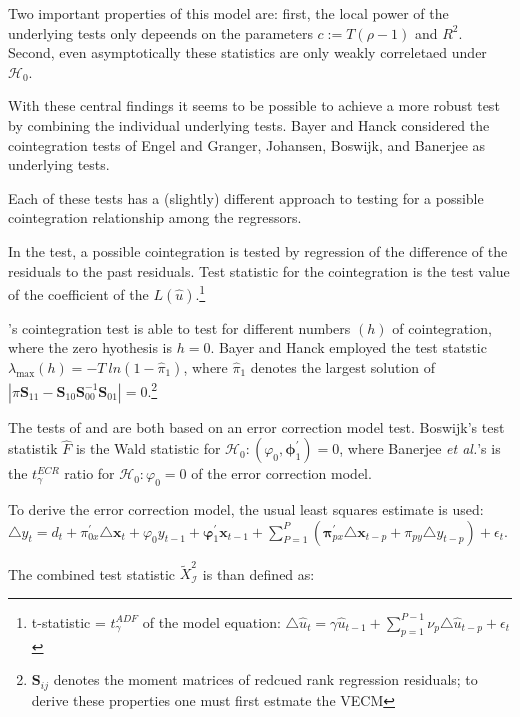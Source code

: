 \documentclass[11pt,a4paper]{article}
\let\rmarkdownfootnote\footnote%
\def\footnote{\protect\rmarkdownfootnote}
\begin{document}
Two important properties of this model are: first, the local power of
the underlying tests only depeends on the parameters \(c := T(\rho -1)\)
and \(R^2\). Second, even asymptotically these statistics are only
weakly correletaed under \(\mathcal{H}_0\).
\autocite{gregory_mixed_2004}

With these central findings it seems to be possible to achieve a more
robust test by combining the individual underlying tests. Bayer and
Hanck considered the cointegration tests of Engel and Granger, Johansen,
Boswijk, and Banerjee as underlying tests.

Each of these tests has a (slightly) different approach to testing for a
possible cointegration relationship among the regressors.

In the \textcite{Englegranger1987} test, a possible cointegration is
tested by regression of the difference of the residuals to the past
residuals. Test statistic for the cointegration is the test value of the
coefficient of the \(L(\hat{u})\).\footnote{t-statistic =
  \(t_{\gamma}^{ADF}\) of the model equation:
  \(\triangle \hat{u}_t = \gamma \hat{u}_{t-1} + \sum_{p = 1}^{P-1}\nu_p \triangle \hat{u}_{t-p} +\epsilon_t\)}

\textcite{Johansen1988}'s cointegration test is able to test for
different numbers \((h)\) of cointegration, where the zero hyothesis is
\(h = 0\). Bayer and Hanck employed the test statstic
\(\lambda_{\max} (h) = - T \ ln(1 - \hat{\pi}_1)\), where
\(\hat{\pi}_1\) denotes the largest solution of
\(|\pi \pmb{S}_{11} - \pmb{S}_{10} \pmb{S}_{00}^{-1} \pmb{S}_{01}|= 0\).\footnote{\(\pmb{S}_{ij}\)
  denotes the moment matrices of redcued rank regression residuals; to
  derive these properties one must first estmate the VECM}

The tests of \textcite{Boswijk1994} and \textcite{Banerjee1998} are both
based on an error correction model test. Boswijk's test statistik
\(\hat{F}\) is the Wald statistic for
\(\mathcal{H}_0: (\varphi_0, \pmb{\phi}_1^{'}) = 0\), where Banerjee
\emph{et al.}'s is the \(t_{\gamma}^{ECR}\) ratio for
\(\mathcal{H}_0 : \varphi_0 = 0\) of the error correction model.

To derive the error correction model, the usual least squares estimate
is used:
\(\triangle y_t = d_t + \pi_{0x}^{'} \triangle \pmb{x}_t + \varphi_0 y_{t-1} + \pmb{\varphi}_{1}^{'} \pmb{x}_{t-1} + \sum_{P = 1}^{P} \left( \pmb{\pi}_{px}^{'} \triangle \pmb{x}_{t-p} + \pi_{py} \triangle y_{t - p} \right) + \epsilon_t\).

The combined test statistic \(\tilde{X}_{\mathcal{I}}^2\) is than
defined as:
\end{document}
